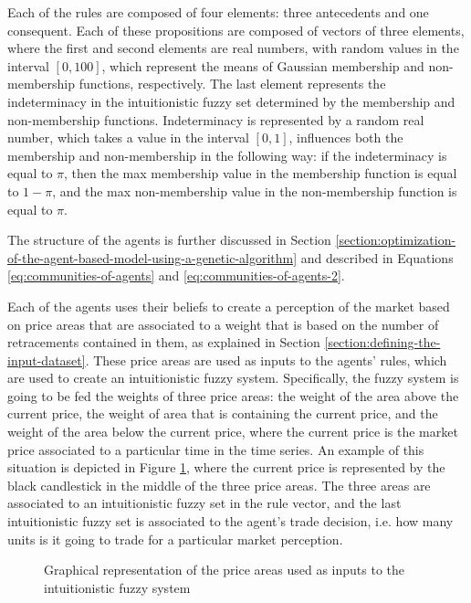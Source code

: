 Each of the rules are composed of four elements: three antecedents and one
consequent. Each of these propositions are composed of vectors of three
elements, where the first and second elements are real numbers, with random
values in the interval $[0, 100]$, which represent the means of Gaussian
membership and non-membership functions, respectively. The last element
represents the indeterminacy in the intuitionistic fuzzy set determined by the
membership and non-membership functions. Indeterminacy is represented by a
random real number, which takes a value in the interval $[0, 1]$, influences
both the membership and non-membership in the following way: if the
indeterminacy is equal to $\pi$, then the max membership value in the membership
function is equal to $1 - \pi$, and the max non-membership value in the
non-membership function is equal to $\pi$.

The structure of the agents is further discussed in Section \ref{section:optimization-of-the-agent-based-model-using-a-genetic-algorithm}
and described in Equations \ref{eq:communities-of-agents} and \ref{eq:communities-of-agents-2}.

Each of the agents uses their beliefs to create a perception of the market based
on price areas that are associated to a weight that is based on the number of
retracements contained in them, as explained in Section
\ref{section:defining-the-input-dataset}. These price areas are used as inputs
to the agents' rules, which are used to create an intuitionistic fuzzy
system. Specifically, the fuzzy system is going to be fed the weights of three
price areas: the weight of the area above the current price, the weight of area
that is containing the current price, and the weight of the area below the
current price, where the current price is the market price associated to a
particular time in the time series. An example of this situation is depicted in
Figure \ref{figure:areas-for-ifis}, where the current price is represented by
the black candlestick in the middle of the three price areas. The three areas
are associated to an intuitionistic fuzzy set in the rule vector, and the last
intuitionistic fuzzy set is associated to the agent's trade decision, i.e. how
many units is it going to trade for a particular market perception.

\begin{figure}
\centering
\caption{Graphical representation of the price areas used as inputs to the
  intuitionistic fuzzy system}
\label{figure:areas-for-ifis}
\end{figure}

